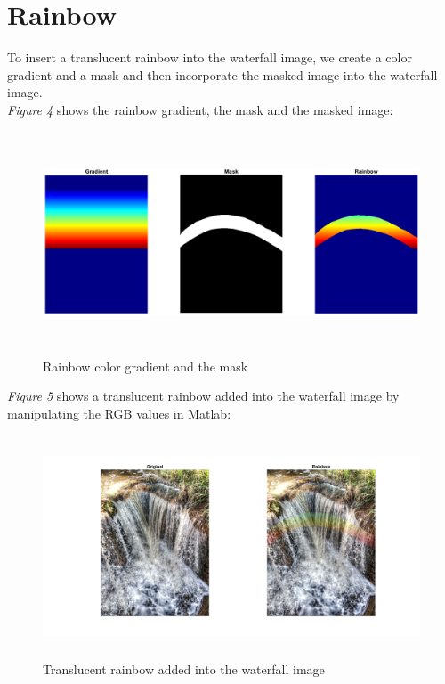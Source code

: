\documentclass[a4paper,11pt]{article}
\begin{document}
\newpage

\section*{Rainbow}
To insert a translucent rainbow into the waterfall image, we create a color gradient and a mask and then incorporate the masked image into the waterfall image.\\
\emph{Figure 4} shows the rainbow gradient, the mask and the masked image:
\begin{figure}[!htb]
  \centering
  \includegraphics[width=14cm, height=6.6cm]{mask.png}
  \caption{\small Rainbow color gradient and the mask}
\end{figure}

\emph{Figure 5} shows a translucent rainbow added into the waterfall image by manipulating the RGB values in Matlab:
\begin{figure}[!htb]
  \centering
  \includegraphics[width=14cm, height=6.6cm]{4.png}
  \caption{\small Translucent rainbow added into the waterfall image}
\end{figure}
\end{document}
